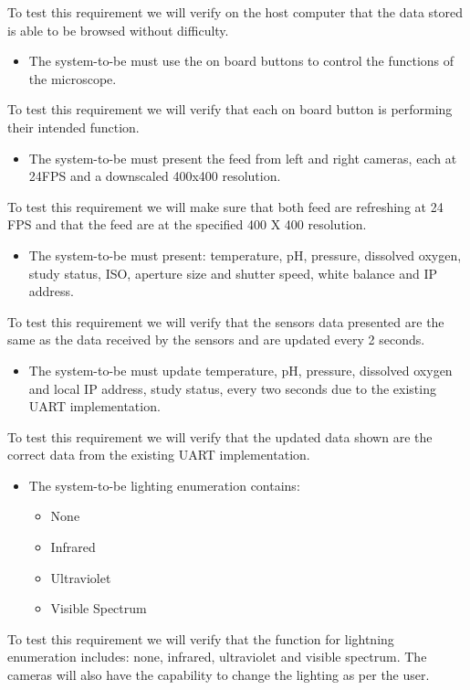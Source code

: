 To test this requirement we will verify on the host computer that the data stored is able to be browsed without difficulty.
\begin{itemize}
    \item The system-to-be must use the on board buttons to control the functions of the microscope.
\end{itemize}
To test this requirement we will verify that each on board button is performing their intended function.
\begin{itemize}
   \item The system-to-be must present the feed from left and right cameras, each at 24FPS and a downscaled 400x400 resolution.
\end{itemize}
To test this requirement we will make sure that both feed are refreshing at 24 FPS and that the feed are at the specified 400 X 400 resolution.
\begin{itemize}
    \item The system-to-be must present: temperature, pH, pressure, dissolved oxygen, study status, ISO, aperture size and shutter speed, white balance and IP address.
\end{itemize}
To test this requirement we will verify that the sensors data presented are the same as the data received by the sensors and are updated every 2 seconds.
\begin{itemize}
    \item The system-to-be must update temperature, pH, pressure, dissolved oxygen and local IP address, study status, every two seconds due to the existing UART implementation.
\end{itemize}
To test this requirement we will verify that the updated data shown are the correct data from the existing UART implementation.
\begin{itemize}
    \item The system-to-be lighting enumeration contains:
    \begin{itemize}
        \item None
        \item Infrared
        \item Ultraviolet
        \item Visible Spectrum
    \end{itemize}
\end{itemize}
To test this requirement we will verify that the function for lightning enumeration includes: none, infrared, ultraviolet and visible spectrum. The cameras will also have the capability to change the lighting as per the user.

